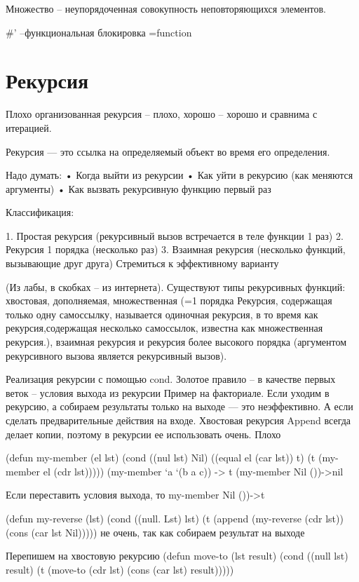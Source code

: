\documentclass[12pt]{report}
\begin{document}
Множество -- неупорядоченная совокупность неповторяющихся элементов.

\#' --функциональная блокировка =function




\section*{Рекурсия}

Плохо организованная рекурсия – плохо, хорошо – хорошо и сравнима с итерацией.


Рекурсия — это ссылка на определяемый объект во время его определения. 




Надо думать:
•	Когда выйти из рекурсии
•	Как уйти в рекурсию (как меняются аргументы)
•	Как вызвать рекурсивную функцию первый раз


Классификация:

1.	Простая рекурсия (рекурсивный вызов встречается в теле функции 1 раз)
2.	Рекурсия 1 порядка (несколько раз)
3.	Взаимная рекурсия (несколько функций, вызывающие друг друга)
Стремиться к эффективному варианту

(Из лабы, в скобках -- из интернета). Существуют типы рекурсивных функций: хвостовая, дополняемая, множественная (=1 порядка Рекурсия, содержащая только одну самоссылку, называется одиночная рекурсия, в то время как рекурсия,содержащая несколько самоссылок, известна как множественная рекурсия.), взаимная рекурсия и рекурсия более высокого порядка (аргументом рекурсивного вызова является рекурсивный вызов).

Реализация рекурсии с помощью cond. 
Золотое правило – в качестве первых веток – условия выхода из рекурсии
Пример на факториале.
Если уходим в рекурсию, а собираем результаты только на выходе — это неэффективно. А если сделать предварительные действия на входе. Хвостовая рекурсия
Append всегда делает копии, поэтому в рекурсии ее использовать очень. Плохо

(defun my-member (el lst)
(cond ((nul lst) Nil)
((equal el (car lst)) t)
(t (my-member el (cdr lst)))))
(my-member ‘a ‘(b a c)) -> t
(my-member Nil ())->nil

Если переставить условия выхода, то my-member Nil ())->t

(defun my-reverse (lst)
(cond ((null. Lst) lst)
(t (append (my-reverse (cdr lst)) (cons (car lst Nil))))) 
не очень, так как собираем результат на выходе

Перепишем на хвостовую рекурсию
(defun move-to (lst result)
(cond ((null lst) result)
(t (move-to (cdr lst) (cons (car lst) result)))))
\end{document}
